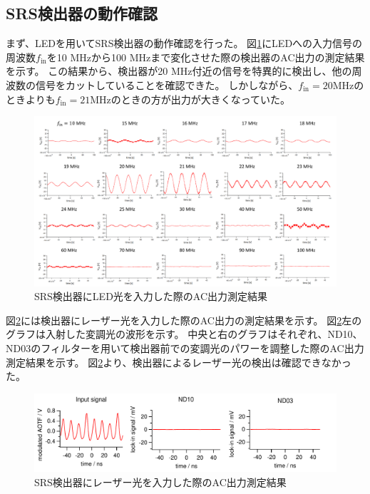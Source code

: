 \documentclass[uplatex,a4paper]{jsarticle}
\begin{document}
\subsection{SRS検出器の動作確認}
まず、LEDを用いてSRS検出器の動作確認を行った。
図\ref{fig:DetectorTest_LED}にLEDへの入力信号の周波数$f_{\mathrm{in}}$を10 MHzから100 MHzまで変化させた際の検出器のAC出力の測定結果を示す。
この結果から、検出器が20 MHz付近の信号を特異的に検出し、他の周波数の信号をカットしていることを確認できた。
しかしながら、$f_{\mathrm{in}}=20 $MHzのときよりも$f_{\mathrm{in}}=21 $MHzのときの方が出力が大きくなっていた。

\begin{figure}[H]
	\centering
	\includegraphics[width=15cm]{figure/3_5_detectorTest_LED.pdf}
	\caption{SRS検出器にLED光を入力した際のAC出力測定結果	\label{fig:DetectorTest_LED}}
\end{figure}

図\ref{fig:DetectorTest_laser}には検出器にレーザー光を入力した際のAC出力の測定結果を示す。
図\ref{fig:DetectorTest_laser}左のグラフは入射した変調光の波形を示す。
中央と右のグラフはそれぞれ、ND10、ND03のフィルターを用いて検出器前での変調光のパワーを調整した際のAC出力測定結果を示す。
図\ref{fig:DetectorTest_laser}より、検出器によるレーザー光の検出は確認できなかった。

\begin{figure}[H]
	\centering
	\includegraphics[width=15cm]{figure/3_6_detectorTest_laser.pdf}
	\caption{SRS検出器にレーザー光を入力した際のAC出力測定結果	\label{fig:DetectorTest_laser}}
\end{figure}
\end{document}

